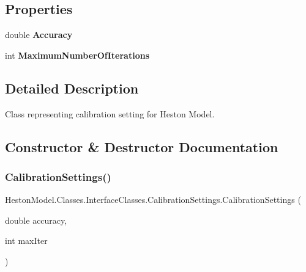 \subsection*{Properties}
\begin{DoxyCompactItemize}
\item 
\mbox{\label{class_heston_model_1_1_classes_1_1_interface_classes_1_1_calibration_settings_a725db4b3186949698463d2248e97d27d}} 
double {\bfseries Accuracy}
\item 
\mbox{\label{class_heston_model_1_1_classes_1_1_interface_classes_1_1_calibration_settings_ab00e84bd27b49307e10013119d6b8c9c}} 
int {\bfseries Maximum\+Number\+Of\+Iterations}
\end{DoxyCompactItemize}


\subsection{Detailed Description}
Class representing calibration setting for Heston Model. 



\subsection{Constructor \& Destructor Documentation}
\mbox{\label{class_heston_model_1_1_classes_1_1_interface_classes_1_1_calibration_settings_aade4360f075f355f3847a4f13baf2431}} 
\subsubsection{\texorpdfstring{Calibration\+Settings()}{CalibrationSettings()}}
{\footnotesize\ttfamily Heston\+Model.\+Classes.\+Interface\+Classes.\+Calibration\+Settings.\+Calibration\+Settings (\begin{DoxyParamCaption}\item[{double}]{accuracy,  }\item[{int}]{max\+Iter }\end{DoxyParamCaption})\hspace{0.3cm}{\ttfamily [inline]}}



